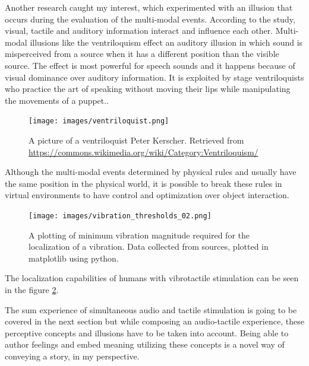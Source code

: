             Another research\cite{Touch_the_Sound} caught my interest, which experimented with an illusion that occurs during the evaluation of the multi-modal events. According to the study, visual, tactile and auditory information interact and influence each other. Multi-modal illusions like the ventriloquism effect an auditory illusion in which sound is misperceived from a source when it has a different position than the visible source. The effect is most powerful for speech sounds and it happens because of visual dominance over auditory information. It is exploited by stage ventriloquists who practice the art of speaking without moving their lips while manipulating the movements of a puppet.\cite{Touch_the_Sound}.\par

            \begin{figure}[H]
                \centering
                \texttt{[image: images/ventriloquist.png]}
                \caption{A picture of a ventriloquist Peter Kerscher. Retrieved from \url{https://commons.wikimedia.org/wiki/Category:Ventriloquism/}}
                \label{fig:VENTRILOQUIST}
            \end{figure}

            Although the multi-modal events determined by physical rules and usually have the same position in the physical world, it is possible to break these rules in virtual environments to have control and optimization over object interaction.\par

            \begin{figure}[H]
                \centering
                \texttt{[image: images/vibration\_thresholds\_02.png]}
                \caption{A plotting of minimum vibration magnitude required for the localization of a vibration. Data collected from sources\cite{Haptic_Perception-A_Tutorial}, plotted in matplotlib using python.}
                \label{fig:VIB_THRESHOLD_02}
            \end{figure}            

            The localization capabilities of humans with vibrotactile stimulation can be seen in the figure \ref{fig:VIB_THRESHOLD_02}.

            The sum experience of simultaneous audio and tactile stimulation is going to be covered in the next section but while composing an audio-tactile experience, these perceptive concepts and illusions have to be taken into account. Being able to author feelings and embed meaning utilizing these concepts is a novel way of conveying a story, in my perspective.\par
